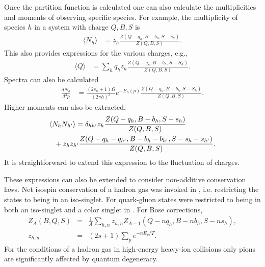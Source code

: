 \documentclass[aps,prc,nofootinbib,showpacs,superscriptaddress,groupedaddress]{revtex4-1}
\begin{document}
Once the partition function is calculated one can also calculate the multiplicities and moments of observing specific species. For example, the multiplicity of species $h$ in a system with charge $Q,B,S$ is
\begin{eqnarray}
\langle N_h\rangle &= z_h\frac{Z(Q-q_h,B-b_h,S-s_h)}{Z(Q,B,S)}.
\end{eqnarray}
This also provides expressions for the various charges, e.g.,
\begin{eqnarray}
\langle Q\rangle &= \sum_h q_hz_h\frac{Z(Q-q_h,B-b_h,S-S_h)}{Z(Q,B,S)}.
\end{eqnarray}
Spectra can also be calculated
\begin{eqnarray}
\frac{dN_h}{d^3p}&=\frac{(2s_h+1)\Omega}{(2\pi\hbar)^3}e^{-E_h(p)}\frac{Z(Q-q_h,B-b_h,S-S_h)}{Z(Q,B,S)}.
\end{eqnarray}
Higher moments can also be extracted,
\begin{eqnarray}
\langle N_hN_{h'}\rangle &= \delta_{hh'}z_h\frac{Z(Q-q_h,B-b_h,S-s_h)}{Z(Q,B,S)}\\
&\hspace*{-30pt}+z_hz_{h'}\frac{Z(Q-q_h-q_{h'},B-b_h-b_{h'},S-s_h-s_{h'})}{Z(Q,B,S)}.
\end{eqnarray}
It is straightforward to extend this expression to the fluctuation of charges.

These expressions can also be extended to consider non-additive conservation laws. Net isospin conservation of a hadron gas was invoked in \cite{Cheng:2002jb}, i.e. restricting the states to being in an iso-singlet.  For quark-gluon states were restricted to being in both an iso-singlet and a color singlet in \cite{Pratt:2003jd}. For Bose corrections,
\begin{eqnarray}\label{eq:bose}
Z_A(B,Q,S)&=&\frac{1}{A}\sum_{h,n}z_{h,n}Z_{A-1}(Q-nq_h,B-nb_h,S-ns_h),\\
z_{h,n}&=&(2s+1)\sum_p e^{-nE_p/T}.
\end{eqnarray}
For the conditions of a hadron gas in high-energy heavy-ion collisions only pions are significantly affected by quantum degeneracy. 
\end{document}
